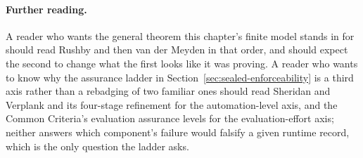 \documentclass[11pt,a4paper]{article}
\theoremstyle{definition}
\begin{document}
\paragraph{Further reading.}
A reader who wants the general theorem this chapter's finite model stands in
for should read Rushby  and then van der Meyden
 in that order, and should expect the second to change what the
first looks like it was proving. A reader who wants to know why the assurance
ladder in Section~\ref{sec:sealed-enforceability} is a third axis rather than a
rebadging of two familiar ones should read Sheridan and Verplank
 and its four-stage refinement
 for the automation-level axis, and the Common
Criteria's evaluation assurance levels  for the
evaluation-effort axis; neither answers which component's failure would
falsify a given runtime record, which is the only question the ladder asks.

\pdprintsolutions
\end{document}
